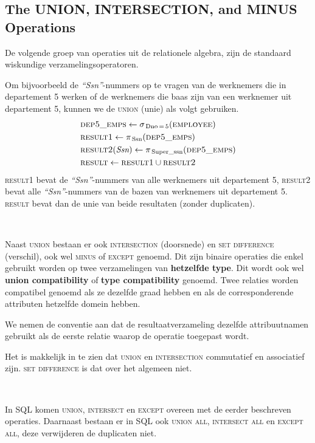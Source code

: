 \subsection{The UNION, INTERSECTION, and MINUS Operations}
De volgende groep van operaties uit de relationele algebra, zijn de standaard wiskundige verzamelingsoperatoren.

Om bijvoorbeeld de \textit{``Ssn''}-nummers op te vragen van de werknemers die in departement 5 werken of de werknemers die baas zijn van een werknemer uit departement 5, kunnen we de \textsc{union} (unie) als volgt gebruiken.
\vspace{-5mm}
\begin{align*}
&\textsc{dep5\_emps} \leftarrow \sigma_{\,\text{Dno}\,=\,5} (\textsc{employee})\\
&\textsc{result1} \leftarrow \pi_{\,\text{Ssn}} (\textsc{dep5\_emps})\\
&\textsc{result2}(\textit{Ssn}) \leftarrow \pi_{\,\text{Super\_ssn}} (\textsc{dep5\_emps})\\
&\textsc{result} \leftarrow \textsc{result1} \cup \textsc{result2}
\end{align*}
\textsc{result1} bevat de \textit{``Ssn''}-nummers van alle werknemers uit departement 5, \textsc{result2} bevat alle \textit{``Ssn''}-nummers van de bazen van werknemers uit departement 5. \textsc{result} bevat dan de unie van beide resultaten (zonder duplicaten).

~

\noindent Naast \textsc{union} bestaan er ook \textsc{intersection} (doorsnede) en \textsc{set difference} (verschil), ook wel \textsc{minus} of \textsc{except} genoemd. Dit zijn binaire operaties die enkel gebruikt worden op twee verzamelingen van \textbf{hetzelfde type}. Dit wordt ook wel \textbf{union compatibility} of \textbf{type compatibility} genoemd. Twee relaties worden compatibel genoemd als ze dezelfde graad hebben en als de corresponderende attributen hetzelfde domein hebben.

We nemen de conventie aan dat de resultaatverzameling dezelfde attribuutnamen gebruikt als de eerste relatie waarop de operatie toegepast wordt.

Het is makkelijk in te zien dat \textsc{union} en \textsc{intersection} commutatief en associatief zijn. \textsc{set difference} is dat over het algemeen niet.

~

\noindent In SQL komen \textsc{union}, \textsc{intersect} en \textsc{except} overeen met de eerder beschreven operaties. Daarnaast bestaan er in SQL ook \textsc{union all}, \textsc{intersect all} en \textsc{except all}, deze verwijderen de duplicaten niet.


